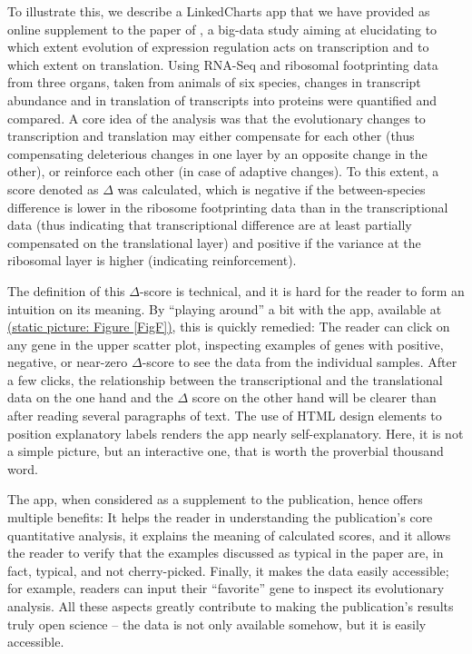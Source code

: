 \documentclass[twocolumn,10pt]{article}
\begin{document}
To illustrate this, we describe a LinkedCharts app that we have provided as online supplement to the paper of \citet{wang_2020}, a big-data study aiming at elucidating to which extent evolution of expression regulation acts on transcription and to which extent on translation. Using RNA-Seq and ribosomal footprinting data from three organs, taken from animals of six species, changes in transcript abundance and in translation of transcripts into proteins were quantified and compared. A core idea of the analysis was that the evolutionary changes to transcription and translation may either compensate for each other  (thus compensating deleterious changes in one layer by an opposite change in the other), or reinforce each other (in case of adaptive changes). To this extent, a score denoted as $\Delta$ was calculated, which is negative if the between-species difference is lower in the ribosome footprinting data than in the transcriptional data (thus indicating that transcriptional difference are at least partially compensated on the translational layer) and positive if the variance at the ribosomal layer is higher (indicating reinforcement).

The definition of this $\Delta$-score is technical, and it is hard for the reader to form an intuition on its meaning. By ``playing around'' a bit with the app, available at \href{https://ex2plorer.kaessmannlab.org/}{(static picture: Figure \ref{FigF})}, this is quickly remedied:  The reader can click on any gene in the upper scatter plot, inspecting examples of genes with positive, negative, or near-zero $\Delta$-score to see the data from the individual samples. After a few clicks, the relationship between the transcriptional and the translational data on the one hand and the $\Delta$ score on the other hand will be clearer than after reading several paragraphs of text. The use of HTML design elements to position explanatory labels renders the app nearly self-explanatory. Here, it is not a simple picture, but an interactive one, that is worth the proverbial thousand word. 

The app, when considered as a supplement to the publication, hence offers multiple benefits: It helps the reader in understanding the publication's core quantitative analysis, it explains the meaning of calculated scores, and it allows the reader to verify that the examples discussed as typical in the paper are, in fact, typical, and not cherry-picked. Finally, it makes the data easily accessible; for example, readers can input their ``favorite'' gene to inspect its evolutionary analysis. All these aspects greatly contribute to making the publication's results truly open science -- the data is not only available somehow, but it is easily accessible.
\end{document}
